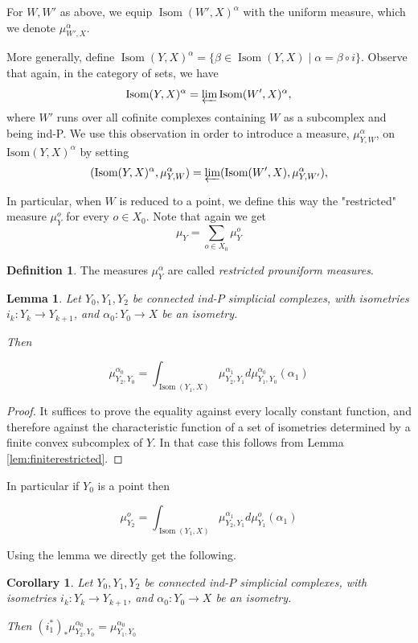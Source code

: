 \documentclass[a4paper, 11pt]{article}
\theoremstyle{plain}
\newtheorem{lemma}[proposition]{Lemma}
\newtheorem{corollary}[proposition]{Corollary}
\theoremstyle{definition}
\newtheorem{definition}[proposition]{Definition}
\theoremstyle{remark}
\DeclareMathOperator{\Isom}{Isom}
\begin{document}
For $W,W'$ as above, 
we equip $\Isom(W',X)^\alpha$
 with the uniform measure, which we denote $\mu_{W',X}^\alpha$.

More generally, define $\Isom(Y,X)^\alpha = \{\beta\in \Isom(Y,X)\mid \alpha=\beta\circ i\}$. Observe that again, in the category of sets, we have
\[ \text{Isom}(Y,X)^\alpha= \varprojlim \text{Isom}(W',X)^\alpha, \]
where $W'$ runs over all cofinite complexes containing $W$ as a subcomplex and being ind-P. 
We use this observation in order to introduce a measure, $\mu_{Y,W}^\alpha $, on $\text{Isom}(Y,X)^\alpha$ by setting
\[ (\text{Isom}(Y,X)^\alpha,\mu_{Y,W}^\alpha) = \varprojlim (\text{Isom}(W',X),\mu_{Y,W'}^\alpha), \]

In particular, when $W$ is reduced to a point, we define this way the "restricted" measure $\mu_Y^o$ for every $o\in X_0$. Note that again we get
$$\mu_Y=\sum_{o\in X_0} \mu_Y^o$$

\begin{definition} 
The measures $\mu_Y^\alpha$ are called \emph{restricted prouniform measures}.
\end{definition}


\begin{lemma}\label{lem:desintegration_prouniform}
Let $Y_0,Y_1,Y_2$ be connected ind-$P$ simplicial complexes, with isometries $i_k:Y_k\to Y_{k+1}$, and $\alpha_0:Y_0\to X$ be an isometry. 

Then

$$\mu_{Y_2,Y_0}^{\alpha_0} = \int_{\Isom(Y_1,X)} \mu_{Y_2,Y_1}^{\alpha_1} d\mu_{Y_1,Y_0}^{\alpha_0} (\alpha_1)$$
\end{lemma}

\begin{proof}
It suffices to prove the equality against every locally constant function, and therefore against the characteristic function of a set of isometries determined by a finite convex subcomplex of $Y$. In that case this follows from Lemma \ref{lem:finiterestricted}.
\end{proof}

In particular if $Y_0$ is a point then 

$$\mu_{Y_2}^{o} = \int_{\Isom(Y_1,X)} \mu_{Y_2,Y_1}^{\alpha_1} d\mu_{Y_1}^{o} (\alpha_1)$$

Using the lemma we directly get the following.

\begin{corollary}\label{cor:measurepreserving}
Let $Y_0,Y_1,Y_2$ be connected ind-$P$ simplicial complexes, with isometries $i_k:Y_k\to Y_{k+1}$, and $\alpha_0:Y_0\to X$ be an isometry. 

Then $(i_1^*)_*\mu_{Y_2,Y_0}^{\alpha_0} = \mu_{Y_1,Y_0}^{\alpha_0}$
\end{corollary}
\end{document}
